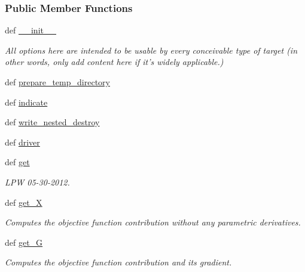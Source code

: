 \subsubsection*{\-Public \-Member \-Functions}
\begin{DoxyCompactItemize}
\item 
def \hyperlink{classforcebalance_1_1psi4io_1_1THCDF__Psi4_a902a91bfce7a9e4eee2501a2b5feda44}{\-\_\-\-\_\-init\-\_\-\-\_\-}
\begin{DoxyCompactList}\small\item\em \-All options here are intended to be usable by every conceivable type of target (in other words, only add content here if it's widely applicable.) \end{DoxyCompactList}\item 
def \hyperlink{classforcebalance_1_1psi4io_1_1THCDF__Psi4_aaaa58c83926697adacd34c31af342fc8}{prepare\-\_\-temp\-\_\-directory}
\item 
def \hyperlink{classforcebalance_1_1psi4io_1_1THCDF__Psi4_a2fd5e08b9c214fc374167a029270be99}{indicate}
\item 
def \hyperlink{classforcebalance_1_1psi4io_1_1THCDF__Psi4_ae4389941b46ce11689f45115fdb61b39}{write\-\_\-nested\-\_\-destroy}
\item 
def \hyperlink{classforcebalance_1_1psi4io_1_1THCDF__Psi4_a14993bd872840bd869fefced495e7ba2}{driver}
\item 
def \hyperlink{classforcebalance_1_1leastsq_1_1LeastSquares_a2010f34730d88209b738d557cca09a1c}{get}
\begin{DoxyCompactList}\small\item\em \-L\-P\-W 05-\/30-\/2012. \end{DoxyCompactList}\item 
def \hyperlink{classforcebalance_1_1target_1_1Target_a606dd136f195c267c05a2455405e5949}{get\-\_\-\-X}
\begin{DoxyCompactList}\small\item\em \-Computes the objective function contribution without any parametric derivatives. \end{DoxyCompactList}\item 
def \hyperlink{classforcebalance_1_1target_1_1Target_afa8cc38c8bba8861c072e789717aa049}{get\-\_\-\-G}
\begin{DoxyCompactList}\small\item\em \-Computes the objective function contribution and its gradient. \end{DoxyCompactList}\item 

\end{DoxyCompactItemize}
